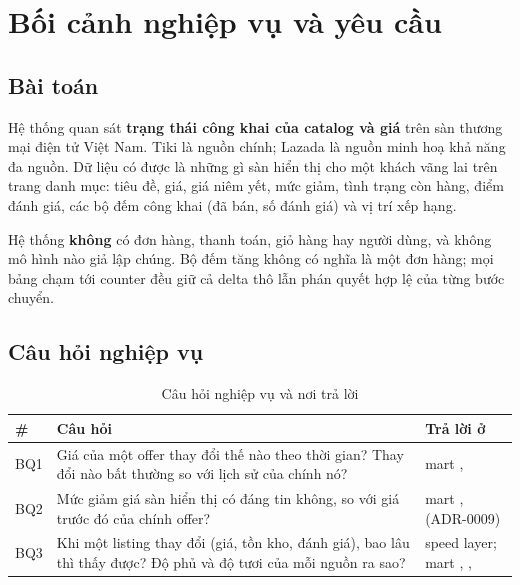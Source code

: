 \chapter{Bối cảnh nghiệp vụ và yêu cầu}\label{chap:req}

\section{Bài toán}
Hệ thống quan sát \textbf{trạng thái công khai của catalog và giá} trên sàn thương mại điện tử Việt Nam.
Tiki là nguồn chính; Lazada là nguồn minh hoạ khả năng đa nguồn. Dữ liệu có được là những gì sàn hiển thị
cho một khách vãng lai trên trang danh mục: tiêu đề, giá, giá niêm yết, mức giảm, tình trạng còn hàng,
điểm đánh giá, các bộ đếm công khai (đã bán, số đánh giá) và vị trí xếp hạng.

Hệ thống \textbf{không} có đơn hàng, thanh toán, giỏ hàng hay người dùng, và không mô hình nào giả lập chúng.
Bộ đếm  tăng không có nghĩa là một đơn hàng; mọi bảng chạm tới counter đều giữ cả delta thô
lẫn phán quyết hợp lệ của từng bước chuyển.

\section{Câu hỏi nghiệp vụ}
\begin{xltabular}{\linewidth}{@{}L{8mm}Y L{58mm}@{}}
  \caption{Câu hỏi nghiệp vụ và nơi trả lời}\label{tab:bq}\\
  \toprule
  \textbf{\#} & \textbf{Câu hỏi} & \textbf{Trả lời ở} \\
  \midrule
  BQ1 & Giá của một offer thay đổi thế nào theo thời gian? Thay đổi nào bất thường so với lịch sử của chính nó? &
        mart ,  \\
  BQ2 & Mức giảm giá sàn hiển thị có đáng tin không, so với giá trước đó của chính offer? &
        mart ,  (ADR-0009) \\
  BQ3 & Khi một listing thay đổi (giá, tồn kho, đánh giá), bao lâu thì thấy được? Độ phủ và độ tươi của mỗi nguồn ra sao? &
        speed layer; mart , ,  \\
  \bottomrule
\end{xltabular}

